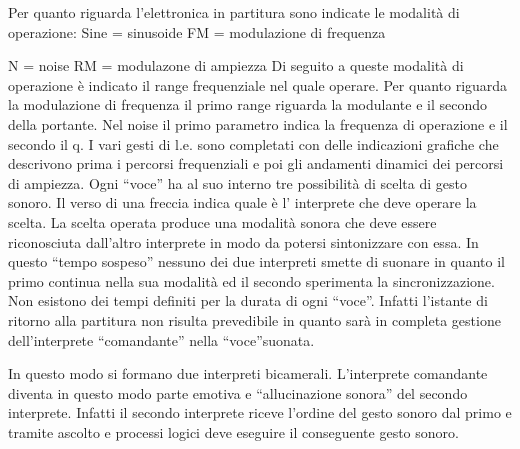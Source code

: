 Per quanto riguarda l’elettronica  in partitura sono indicate le modalità di operazione:
Sine = sinusoide
FM = modulazione di frequenza


N = noise
RM  = modulazone di ampiezza
Di seguito a queste modalità di operazione è indicato il range frequenziale nel quale operare.
Per quanto riguarda la modulazione di frequenza il primo range riguarda la modulante e il secondo della portante.
Nel noise il primo parametro indica la frequenza di operazione e il secondo il q.
I vari gesti di l.e. sono completati con delle indicazioni grafiche che descrivono prima i percorsi frequenziali e poi gli andamenti dinamici dei percorsi di ampiezza.
Ogni “voce” ha al suo interno tre possibilità di scelta di gesto sonoro.
Il verso di una freccia indica quale è l’ interprete  che deve operare la scelta.
La scelta operata produce una modalità sonora che deve essere riconosciuta dall’altro interprete in modo da potersi sintonizzare con essa.
In questo “tempo sospeso” nessuno dei due interpreti smette di suonare  in quanto il primo continua nella sua modalità ed il secondo sperimenta la sincronizzazione.
Non esistono  dei tempi definiti per la  durata di ogni “voce”.
Infatti l’istante di ritorno alla partitura non risulta prevedibile  in quanto  sarà in completa gestione dell’interprete “comandante” nella “voce”suonata.

In questo modo si formano due interpreti bicamerali.
L’interprete comandante diventa in questo modo parte emotiva e “allucinazione sonora” del secondo interprete. Infatti il secondo interprete riceve l’ordine del gesto sonoro dal primo e tramite ascolto e processi logici deve eseguire  il conseguente gesto sonoro.
